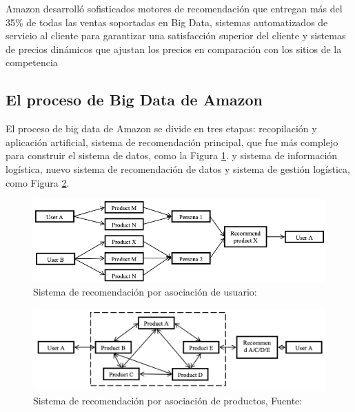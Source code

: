 Amazon desarrolló sofisticados motores de recomendación que entregan más del 35\% de todas las ventas soportadas en Big Data, sistemas automatizados de servicio al cliente para garantizar una satisfacción superior del cliente y sistemas de precios dinámicos que ajustan los precios en comparación con los sitios de la competencia 

\subsection{El proceso de Big Data de Amazon}

El proceso de big data  de Amazon se divide en tres etapas: recopilación y aplicación artificial, sistema de recomendación principal, que fue más complejo para construir el sistema de datos, como la Figura \ref{fig:4}. y sistema de información logística, nuevo sistema de recomendación de datos y sistema de gestión logística, como Figura \ref{fig:5}. 

\begin{figure}[h]
	\centering
	\includegraphics[scale=.5] {img/recomendation-system}
	\caption{Sistema de recomendación por asociación de usuario: }
	\label{fig:4}	
\end{figure}

\begin{figure}[h]
	\centering
	\includegraphics[scale=.3] {img/asocacion_productos}
	\caption{Sistema de recomendación por asociación de productos, Fuente: }
	\label{fig:5}	
\end{figure}



